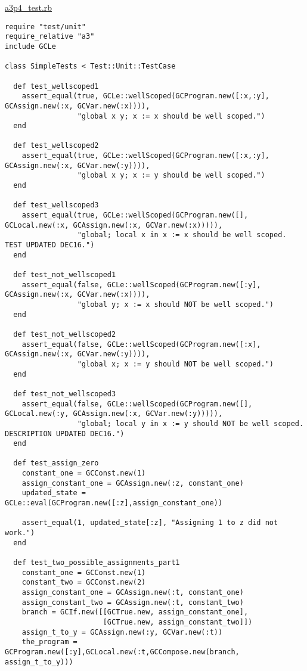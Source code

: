 \documentclass[11pt]{article}
\theoremstyle{definition}
\begin{document}
\href{./testing/a3p4\_test.rb}{a3p4\_test.rb}
\begin{verbatim}
require "test/unit"
require_relative "a3"
include GCLe

class SimpleTests < Test::Unit::TestCase
  
  def test_wellscoped1
    assert_equal(true, GCLe::wellScoped(GCProgram.new([:x,:y], GCAssign.new(:x, GCVar.new(:x)))),
                 "global x y; x := x should be well scoped.")
  end

  def test_wellscoped2
    assert_equal(true, GCLe::wellScoped(GCProgram.new([:x,:y], GCAssign.new(:x, GCVar.new(:y)))),
                 "global x y; x := y should be well scoped.")
  end

  def test_wellscoped3
    assert_equal(true, GCLe::wellScoped(GCProgram.new([], GCLocal.new(:x, GCAssign.new(:x, GCVar.new(:x))))),
                 "global; local x in x := x should be well scoped. TEST UPDATED DEC16.")
  end

  def test_not_wellscoped1
    assert_equal(false, GCLe::wellScoped(GCProgram.new([:y], GCAssign.new(:x, GCVar.new(:x)))),
                 "global y; x := x should NOT be well scoped.")
  end

  def test_not_wellscoped2
    assert_equal(false, GCLe::wellScoped(GCProgram.new([:x], GCAssign.new(:x, GCVar.new(:y)))),
                 "global x; x := y should NOT be well scoped.")
  end

  def test_not_wellscoped3
    assert_equal(false, GCLe::wellScoped(GCProgram.new([], GCLocal.new(:y, GCAssign.new(:x, GCVar.new(:y))))),
                 "global; local y in x := y should NOT be well scoped. DESCRIPTION UPDATED DEC16.")
  end

  def test_assign_zero
    constant_one = GCConst.new(1)
    assign_constant_one = GCAssign.new(:z, constant_one)
    updated_state = GCLe::eval(GCProgram.new([:z],assign_constant_one))

    assert_equal(1, updated_state[:z], "Assigning 1 to z did not work.")
  end

  def test_two_possible_assignments_part1
    constant_one = GCConst.new(1)
    constant_two = GCConst.new(2)
    assign_constant_one = GCAssign.new(:t, constant_one)
    assign_constant_two = GCAssign.new(:t, constant_two)
    branch = GCIf.new([[GCTrue.new, assign_constant_one],
                       [GCTrue.new, assign_constant_two]])
    assign_t_to_y = GCAssign.new(:y, GCVar.new(:t))
    the_program = GCProgram.new([:y],GCLocal.new(:t,GCCompose.new(branch, assign_t_to_y)))


\end{verbatim}
\end{document}
